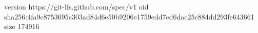 version https://git-lfs.github.com/spec/v1
oid sha256:4fa9c8753695c303ad84d6e50b9206e1759edd7cd6dac25c884dd293fe643661
size 174916
